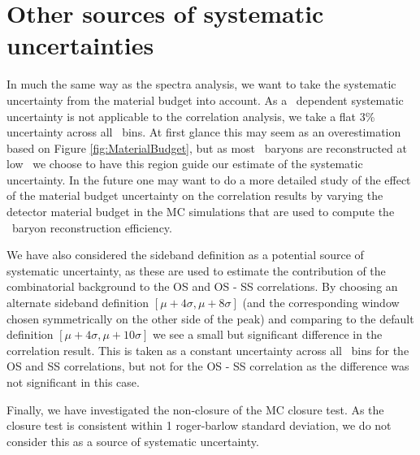   \section{Other sources of systematic uncertainties}

  In much the same way as the spectra analysis, we want to take the systematic uncertainty from the material budget into account. As a \pt\ dependent systematic uncertainty is not applicable to the correlation analysis, we take a flat 3\% uncertainty across all \dphi\ bins. At first glance this may seem as an overestimation based on Figure \ref{fig:MaterialBudget}, but as most \Xi\ baryons are reconstructed at low \pt\ we choose to have this region guide our estimate of the systematic uncertainty. In the future one may want to do a more detailed study of the effect of the material budget uncertainty on the correlation results by varying the detector material budget in the MC simulations that are used to compute the \Xi\ baryon reconstruction efficiency. 

  We have also considered the sideband definition as a potential source of systematic uncertainty, as these are used to estimate the contribution of the combinatorial background to the OS and OS - SS correlations. By choosing an alternate sideband definition $[\mu + 4\sigma, \mu + 8\sigma]$ (and the corresponding window chosen symmetrically on the other side of the peak) and comparing to the default definition $[\mu + 4\sigma, \mu + 10\sigma]$ we see a small but significant difference in the correlation result. This is taken as a constant uncertainty across all \dphi\ bins for the OS and SS correlations, but not for the OS - SS correlation as the difference was not significant in this case. 

  Finally, we have investigated the non-closure of the MC closure test. As the closure test is consistent within 1 roger-barlow  standard deviation, we do not consider this as a source of systematic uncertainty. 


